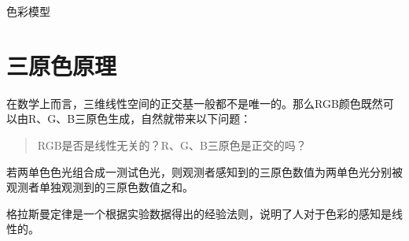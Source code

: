 \begin{definition}
  色彩模型
\end{definition}

\begin{example}[sRGB色彩空间]
  
\end{example}

\begin{example}
  
\end{example}

\begin{definition}[绝对色彩空间]
  
\end{definition}

\section{三原色原理}
\label{sec:three-primary-color-theory}

在数学上而言，三维线性空间的正交基一般都不是唯一的。那么RGB颜色既然可以由R、G、B三原色生成，自然就带来以下问题：
\begin{quotation}
  RGB是否是线性无关的？{\color{red}R}、{\color{green}G}、{\color{blue}B}三原色是正交的吗？
\end{quotation}

\begin{theorem}
  若两单色色光组合成一测试色光，则观测者感知到的三原色数值为两单色光分别被观测者单独观测到的三原色数值之和。

  格拉斯曼定律是一个根据实验数据得出的经验法则，说明了人对于色彩的感知是线性的。
\end{theorem}
